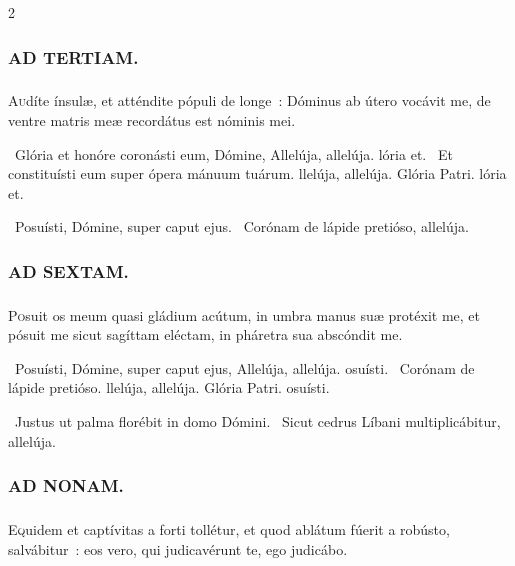 \documentclass[9pt,twoside]{extarticle}
\begin{document}
\begin{multicols}{2}
{\subsubsection*{\center \textsc{AD TERTIAM.}}
\subsubsection*{}
\lettrine{A}udíte ínsulæ, et atténdite pópuli de longe~: Dóminus ab útero vocávit me, de ventre matris meæ recordátus est nóminis mei.

\begin{tightlist}{}
\item {}~Glória et honóre coronásti eum, Dómine, \textred{*} Allelúja, allelúja. lória et.
~Et constituísti eum super ópera mánuum tuárum. llelúja, allelúja.
Glória Patri. lória et.
\item {}~Posuísti, Dómine, super caput ejus. ~Corónam de lápide pretióso, allelúja.
\end{tightlist}

\subsubsection*{\center \textsc{AD SEXTAM.}}
\subsubsection*{}
\lettrine{P}osuit os meum quasi gládium acútum, in umbra manus suæ protéxit me, et pósuit me sicut sagíttam eléctam, in pháretra sua abscóndit me.

\begin{tightlist}{}
\item {}~Posuísti, Dómine, super caput ejus, \textred{*} Allelúja, allelúja. osuísti.
~Corónam de lápide pretióso. llelúja, allelúja.
Glória Patri. osuísti.
\item {}~Justus ut palma florébit in domo Dómini. ~Sicut cedrus Líbani multiplicábitur, allelúja.
\end{tightlist}

\subsubsection*{\center \textsc{AD NONAM.}}
\subsubsection*{}
\lettrine{E}quidem et captívitas a forti tollétur, et quod ablátum fúerit a robústo, salvábitur~: eos vero, qui judicavérunt te, ego judicábo.

}
\end{multicols}
\end{document}
